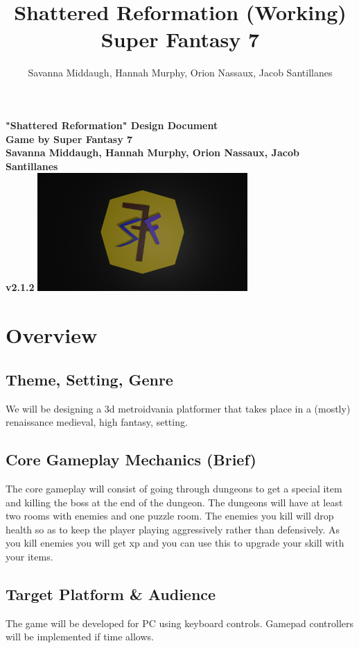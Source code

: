 \documentclass[titlepage]{article}
\title{Shattered Reformation (Working)\\Super Fantasy 7}
\author{Savanna Middaugh, Hannah Murphy, Orion Nassaux, Jacob Santillanes}
\begin{document}
\begin{titlepage}
    \centering
    \vfill
    {\bfseries\Large
        "Shattered Reformation" Design Document\\
        Game by Super Fantasy 7\\
        \vskip2cm
        Savanna Middaugh, Hannah Murphy, Orion Nassaux, Jacob Santillanes\\
	v2.1.2
    }    
    \vfill
    \includegraphics[width=8cm]{./images/logo.png}
    \vfill
    \vfill
\end{titlepage}

\section{Overview}

\subsection*{Theme, Setting, Genre}
We will be designing a 3d metroidvania platformer that takes place in a (mostly)
 renaissance medieval, high fantasy, setting. 

\subsection*{Core Gameplay Mechanics (Brief)}
The core gameplay will consist of going through dungeons to get a special item 
and killing the boss at the end of the dungeon. The dungeons will have at least 
two rooms with enemies and one puzzle room. The enemies you kill will drop 
health so as to keep the player playing aggressively rather than defensively. As
 you kill enemies you will get xp and you can use this to upgrade your skill 
 with your items. 

\subsection*{Target Platform \& Audience}
The game will be developed for PC using keyboard controls. Gamepad controllers 
will be implemented if time allows. \\
\end{document}
